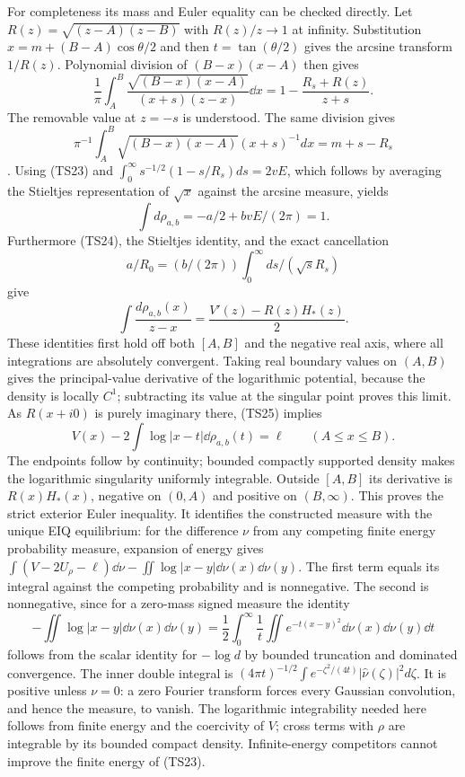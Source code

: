 For completeness its mass and Euler equality can be checked directly.
Let $R(z)=\sqrt{(z-A)(z-B)}$ with $R(z)/z\to1$ at infinity.
Substitution $x=m+(B-A)\cos\theta/2$ and then
$t=\tan(\theta/2)$ gives the arcsine transform $1/R(z)$.
Polynomial division of $(B-x)(x-A)$ then gives
\begin{equation}\tag{TS24}
 \frac1\pi\int_A^B\frac{\sqrt{(B-x)(x-A)}}{(x+s)(z-x)}\dd x
 =1-\frac{R_s+R(z)}{z+s}.
\end{equation}
The removable value at $z=-s$ is understood. The same division gives
\[\pi^{-1}\int_A^B\sqrt{(B-x)(x-A)}(x+s)^{-1}dx=m+s-R_s\].
Using (TS23) and $\int_0^\infty s^{-1/2}(1-s/R_s)ds=2vE$,
which follows by averaging the Stieltjes representation of $\sqrt x$
against the arcsine measure, yields
\[
 \int d\rho_{a,b}=-a/2+bvE/(2\pi)=1.
\]
Furthermore (TS24), the Stieltjes identity, and the exact cancellation
\[a/R_0=(b/(2\pi))\int_0^\infty ds/(\sqrt sR_s)\] give
\begin{equation}\tag{TS25}
 \int\frac{d\rho_{a,b}(x)}{z-x}
 =\frac{V'(z)-R(z)H_*(z)}2.
\end{equation}
These identities first hold off both $[A,B]$ and the negative real
axis, where all integrations are absolutely convergent. Taking real
boundary values on $(A,B)$ gives the principal-value derivative
of the logarithmic potential, because the density is locally $C^1$;
subtracting its value at the singular point proves this limit.
As $R(x+i0)$ is purely imaginary there, (TS25) implies
\begin{equation}\tag{TS26}
 V(x)-2\int\log|x-t|\dd\rho_{a,b}(t)=\ell\qquad(A\leq x\leq B).
\end{equation}
The endpoints follow by continuity; bounded compactly supported
density makes the logarithmic singularity uniformly integrable.
Outside $[A,B]$ its derivative is $R(x)H_*(x)$, negative on $(0,A)$
and positive on $(B,\infty)$. This proves the strict exterior Euler
inequality. It identifies the constructed measure with the unique
EIQ equilibrium: for the difference $\nu$ from any competing finite
energy probability measure, expansion of energy gives
$\int(V-2U_\rho-\ell)\dd\nu-\iint\log|x-y|\dd\nu(x)\dd\nu(y)$.
The first term equals its integral against the competing probability
and is nonnegative. The second is nonnegative, since for a zero-mass
signed measure the identity
\[
 -\iint\log|x-y|\dd\nu(x)\dd\nu(y)
 =\frac12\int_0^\infty\frac1t
       \iint e^{-t(x-y)^2}\dd\nu(x)\dd\nu(y)\dd t
\]
follows from the scalar identity for $-\log d$ by bounded truncation
and dominated convergence. The inner double integral is
$(4\pi t)^{-1/2}\int e^{-\zeta^2/(4t)}|\widehat\nu(\zeta)|^2d\zeta$.
It is positive unless $\nu=0$: a zero Fourier transform forces every
Gaussian convolution, and hence the measure, to vanish. The
logarithmic integrability needed here follows from finite energy and
the coercivity of $V$; cross terms with $\rho$ are integrable by its
bounded compact density. Infinite-energy competitors cannot improve
the finite energy of (TS23).


